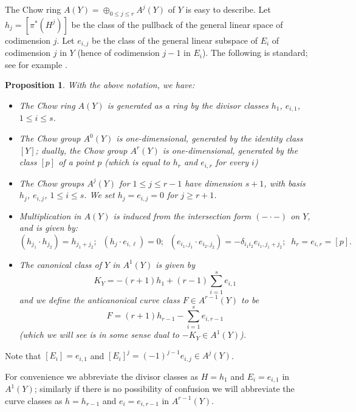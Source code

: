 \documentclass[12pt]{article}
\numberwithin{equation}{section}
\newtheorem{proposition}[equation]{Proposition}
\numberwithin{equation}{section}
\numberwithin{subeq}{equation}
\begin{document}
The Chow ring $A(Y) = \oplus_{0 \leq j \leq r} A^j(Y)$ of $Y$
is easy to describe.
Let $h_j = [\pi^*(H^j)]$ be the class of the pullback of the general linear space of codimension $j$.
Let $e_{i,j}$ be the class of the general linear subspace of $E_i$ of codimension $j$ in $Y$
(hence of codimension $j-1$ in $E_i$).
The following is standard; see for example \cite{EH}.

\begin{proposition}
With the above notation, we have:
\begin{itemize}
\item[(a)] The Chow ring $A(Y)$ is generated as a ring by the divisor classes
$h_1$, $e_{i,1}$, $1\leq i \leq s$.
\item[(b)] The Chow group $A^0(Y)$ is one-dimensional,
generated by the identity class $[Y]$;
dually, the Chow group $A^{r}(Y)$ is one-dimensional,
generated by the class $[p]$ of a point $p$
(which is equal to $h_r$ and $e_{i,r}$ for every $i$)
\item[(c)] The Chow groups $A^j(Y)$ for $1 \leq j \leq r-1$ have dimension $s+1$,
with basis
$h_j$, $e_{i,j}$, $1 \leq i \leq s$.
We set $h_j = e_{i,j} = 0$ for $j \geq r+1$.
\item[(d)] Multiplication in $A(Y)$ is induced from
the intersection form $(-\cdot -)$ on $Y$,
and is given by:
\[
(h_{j_1} \cdot h_{j_2}) = h_{j_1+j_2};\;\;
(h_j \cdot e_{i,\ell}) = 0;\;\;
(e_{i_1,j_1}\cdot e_{i_2,j_2}) = -\delta_{i_1i_2} e_{i_1,j_1+j_2};\;\;
h_r = e_{i,r} = [p].
\]
\item[(e)] The canonical class of $Y$ in $A^1(Y)$ is given by
\[
K_Y = -(r+1) h_1 + (r-1) \sum_{i=1}^s e_{i,1}
\]
and we define the \emph{anticanonical curve class} $F \in A^{r-1}(Y)$ to be
\[
F = (r+1)h_{r-1} - \sum_{i=1}^s e_{i,r-1}
\]
(which we will see is in some sense dual to $-K_Y \in A^1(Y)$).
\end{itemize}
\end{proposition}



Note that $[E_i] = e_{i,1}$ and $[E_i]^j = {(-1)}^{j-1} e_{i,j} \in A^j(Y)$.

For convenience we abbreviate the divisor classes as $H = h_1$ and $E_i = e_{i,1}$ in $A^1(Y)$;
similarly if there is no possibility of confusion we will abbreviate the curve classes
as $h = h_{r-1}$ and $e_i = e_{i,r-1}$ in $A^{r-1}(Y)$.
\end{document}
